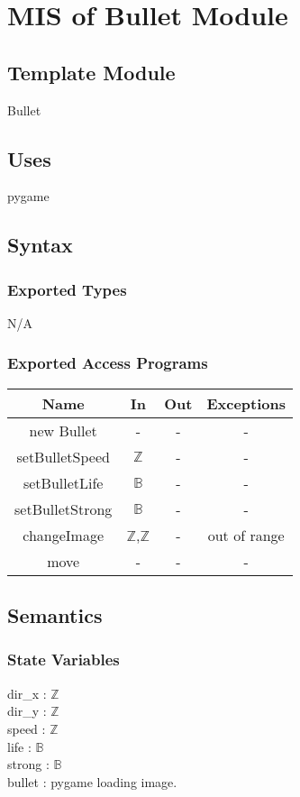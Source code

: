 \documentclass[12pt, titlepage]{article}
\begin{document}
\section{MIS of Bullet Module}
        \subsection{Template Module}
        Bullet
        \subsection{Uses}
        pygame
		\subsection{Syntax}
		\subsubsection{Exported Types}
		N/A
		\subsubsection{Exported Access Programs}
		\begin{tabular}[pos]{|c|c|c|c|}
			
			\hline
			\textbf{Name}& \textbf{In} & \textbf{Out} & \textbf{Exceptions} \\ \hline
			new Bullet & - & - & -\\ \hline
			setBulletSpeed & $\mathbb{Z}$ & - & -\\ \hline
			setBulletLife & $\mathbb{B}$ & - & -\\ \hline
			setBulletStrong & $\mathbb{B}$ & - & -\\ \hline
			changeImage & $\mathbb{Z}$,$\mathbb{Z}$ & - & out of range\\ \hline
			move & - & - & -\\ \hline
			
		\end{tabular}
		
		\subsection{Semantics}
		\subsubsection{State Variables}
		dir\_x : $\mathbb{Z}$\\
		dir\_y : $\mathbb{Z}$\\
		speed  : $\mathbb{Z}$\\
		life   : $\mathbb{B}$\\
		strong : $\mathbb{B}$\\
		bullet : pygame loading image.
		
\end{document}
